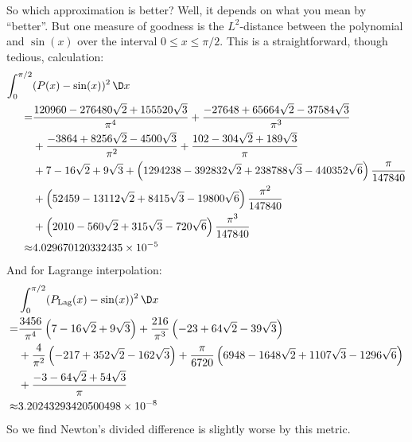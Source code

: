 \begin{ex}
So which approximation is better? Well, it depends on what you mean by
``better''. But one measure of goodness is the $L^{2}$-distance between
the polynomial and $\sin(x)$ over the interval $0\leq x\leq \pi/2$. This
is a straightforward, though tedious, calculation:
\begin{equation}
  \begin{split}
  \int^{\pi/2}_{0}&(P(x)-\sin(x))^{2}\,\D x\\
 =& \frac{120960-276480\sqrt{2}+155520 \sqrt{3}}{\pi ^4}
  +\frac{-27648+65664\sqrt{2}-37584 \sqrt{3}}{\pi^3}\\
  &+\frac{-3864+8256 \sqrt{2}-4500\sqrt{3}}{\pi^2}
  +\frac{102-304 \sqrt{2}+189 \sqrt{3}}{\pi}\\
  &+7 - 16\sqrt{2} + 9\sqrt{3}
+\left(1294238-392832 \sqrt{2}+238788 \sqrt{3}-440352 \sqrt{6}\right)
  \frac{\pi }{147840}\\
&+\left(52459-13112 \sqrt{2}+8415 \sqrt{3}-19800 \sqrt{6}\right)
\frac{\pi^2}{147840}\\
&+\left(2010-560 \sqrt{2}+315 \sqrt{3}-720 \sqrt{6}\right) \frac{\pi^3}{147840}\\
\approx&4.029670120332435\times 10^{-5}
  \end{split}
\end{equation}
And for Lagrange interpolation:
\begin{equation}
  \begin{split}
  &\int^{\pi/2}_{0}(P_{\text{Lag}}(x)-\sin(x))^{2}\,\D x\\
  =& \frac{3456}{\pi ^4} \left(7-16 \sqrt{2}+9 \sqrt{3}\right)
  +\frac{216}{\pi ^3}\left(-23+64 \sqrt{2}-39 \sqrt{3}\right)\\
  &+\frac{4}{\pi ^2} \left(-217+352\sqrt{2}-162 \sqrt{3}\right)
  +\frac{\pi}{6720} \left(6948-1648 \sqrt{2}+1107 \sqrt{3}-1296 \sqrt{6}\right) \\
  &+\frac{-3-64 \sqrt{2}+54 \sqrt{3}}{\pi}\\
  \approx&3.20243293420500498\times 10^{-8}
  \end{split}
\end{equation}
So we find Newton's divided difference is slightly worse by this metric.
\end{ex}
